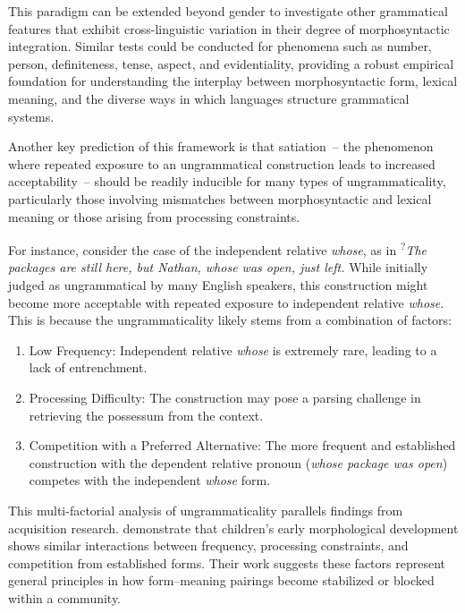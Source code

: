 \documentclass[12pt,letterpaper]{article}
\begin{document}
This paradigm can be extended beyond gender to investigate other grammatical features that exhibit cross-linguistic variation in their degree of morphosyntactic integration. Similar tests could be conducted for phenomena such as number, person, definiteness, tense, aspect, and evidentiality, providing a robust empirical foundation for understanding the interplay between morphosyntactic form, lexical meaning, and the diverse ways in which languages structure grammatical systems.

\bigskip
Another key prediction of this framework is that satiation~-- the phenomenon where repeated exposure to an ungrammatical construction leads to increased acceptability~-- should be readily inducible for many types of ungrammaticality, particularly those involving mismatches between morphosyntactic and lexical meaning or those arising from processing constraints.

For instance, consider the case of the independent relative \textit{whose}, as in \textsuperscript{?}\textit{The packages are still here, but Nathan, whose was open, just left.} While initially judged as ungrammatical by many English speakers, this construction might become more acceptable with repeated exposure to independent relative \textit{whose}. This is because the ungrammaticality likely stems from a combination of factors:

\begin{enumerate}
    \item Low Frequency: Independent relative \textit{whose} is extremely rare, leading to a lack of entrenchment.
    \item Processing Difficulty: The construction may pose a parsing challenge in retrieving the possessum from the context.
    \item Competition with a Preferred Alternative: The more frequent and established construction with the dependent relative pronoun (\textit{whose package was open}) competes with the independent \textit{whose} form.
\end{enumerate}

This multi-factorial analysis of ungrammaticality parallels findings from acquisition research. \textcite{dressler1995} demonstrate that children's early morphological development shows similar interactions between frequency, processing constraints, and competition from established forms. Their work suggests these factors represent general principles in how form--meaning pairings become stabilized or blocked within a community.
\end{document}
